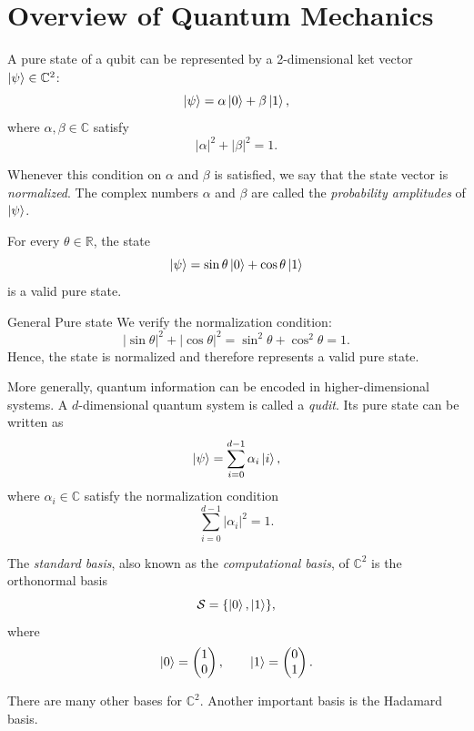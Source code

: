 \section{Overview of Quantum Mechanics}

A pure state of a qubit can be represented by a 2-dimensional ket vector 
$\ket{\psi} \in \mathbb{C}^{2}$:
\[
\ket{\psi} = \alpha \ket{0} + \beta \ket{1},
\]
where $\alpha, \beta \in \mathbb{C}$ satisfy
\[
|\alpha|^2 + |\beta|^2 = 1.
\]

Whenever this condition on $\alpha$ and $\beta$ is satisfied, we say that the state vector is \emph{normalized}. The complex numbers $\alpha$ and $\beta$ are called the \emph{probability amplitudes} of $\ket{\psi}$.

\begin{theorem}
For every $\theta \in \mathbb{R}$, the state
\[
\ket{\psi} = \sin\theta \ket{0} + \cos\theta \ket{1}
\]
is a valid pure state.
\end{theorem}

\begin{theo}{General Pure state}
We verify the normalization condition:
\[
|\sin\theta|^2 + |\cos\theta|^2
= \sin^2\theta + \cos^2\theta
= 1.
\]
Hence, the state is normalized and therefore represents a valid pure state.
\end{theo}

More generally, quantum information can be encoded in higher-dimensional systems. A $d$-dimensional quantum system is called a \emph{qudit}. Its pure state can be written as
\[
\ket{\psi} = \sum_{i=0}^{d-1} \alpha_i \ket{i},
\]
where $\alpha_i \in \mathbb{C}$ satisfy the normalization condition
\[
\sum_{i=0}^{d-1} |\alpha_i|^2 = 1.
\]

\begin{definition}
The \emph{standard basis}, also known as the \emph{computational basis}, of 
$\mathbb{C}^2$ is the orthonormal basis
\[
\mathcal{S} = \{\ket{0}, \ket{1}\},
\]
where
\[
\ket{0} =
\begin{pmatrix}
1\\
0
\end{pmatrix},
\qquad
\ket{1} =
\begin{pmatrix}
0\\
1
\end{pmatrix}.
\]
\end{definition}

There are many other bases for $\mathbb{C}^2$. Another important basis is the Hadamard basis.

